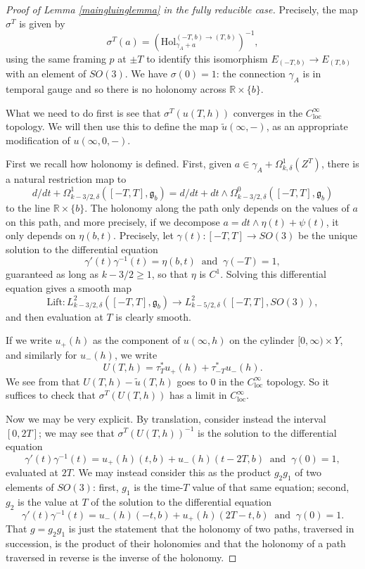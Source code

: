\documentclass[10pt,a4paper]{amsart}
\theoremstyle{definition}
\theoremstyle{remark}
\numberwithin{figure}{qchap}
\begin{document}
\begin{proof}[Proof of Lemma \ref{maingluinglemma} in the fully reducible case]
Precisely, the map $\sigma^T$ is given by $$\sigma^T(a) = \left(\text{Hol}_{\gamma_A + a}^{(-T,b) \to (T,b)}\right)^{-1},$$ using the same framing $p$ at $\pm T$ to identify this isomorphism $E_{(-T,b)} \to E_{(T, b)}$ with an element of $SO(3)$. We have $\sigma(0) = 1$: the connection $\gamma_A$ is in temporal gauge and so there is no holonomy across $\mathbb R \times \{b\}$.

What we need to do first is see that $\sigma^T(u(T, h))$ converges in the $C^\infty_{\text{loc}}$ topology. We will then use this to define the map $\widetilde u(\infty, -)$, as an appropriate modification of $u(\infty, 0, -)$.

First we recall how holonomy is defined. First, given $a \in \gamma_A + \Omega^1_{k,\delta}(Z^T)$, there is a natural restriction map to $$d/dt + \Omega^1_{k-3/2,\delta}([-T, T], \mathfrak g_b) = d/dt + dt \wedge \Omega^0_{k-3/2, \delta}([-T, T], \mathfrak g_b)$$ to the line $\mathbb R \times \{b\}$. The holonomy along the path only depends on the values of $a$ on this path, and more precisely, if we decompose $a = dt \wedge \eta(t) + \psi(t)$, it only depends on $\eta(b,t)$. Precisely, let $\gamma(t): [-T, T] \to SO(3)$ be the unique solution to the differential equation 
$$\gamma'(t) \gamma^{-1}(t) = \eta(b,t) \;\; \text{and} \;\; \gamma(-T) = 1,$$ 
guaranteed as long as $k-3/2 \geq 1$, so that $\eta$ is $C^1$. Solving this differential equation gives a smooth map 
$$\text{Lift}: L^2_{k-3/2,\delta}([-T, T], \mathfrak g_b) \to L^2_{k-5/2,\delta}([-T, T], SO(3)),$$ 
and then evaluation at $T$ is clearly smooth.

If we write $u_+(h)$ as the component of $u(\infty, h)$ on the cylinder $[0,\infty) \times Y$, and similarly for $u_-(h)$, we write 
$$U(T, h) = \tau_T^*u_+(h) + \tau_{-T}^* u_-(h).$$ 
We see from \cite[Lemma~3.5.19]{Lin} that $U(T, h) - \widetilde u(T, h)$ goes to $0$ in the $C^\infty_{\text{loc}}$ topology. So it suffices to check that $\sigma^T(U(T, h))$ has a limit in $C^\infty_{\text{loc}}.$

Now we may be very explicit. By translation, consider instead the interval $[0, 2T]$; we may see that $\sigma^T(U(T, h))^{-1}$ is the solution to the differential equation $$\gamma'(t) \gamma^{-1}(t) = u_+(h)(t,b) + u_-(h)(t-2T,b)\;\; \text{and} \;\; \gamma(0) = 1,$$ evaluated at $2T$. We may instead consider this as the product $g_2 g_1$ of two elements of $SO(3)$: first, $g_1$ is the time-$T$ value of that same equation; second, $g_2$ is the value at $T$ of the solution to the differential equation 
$$\gamma'(t) \gamma^{-1}(t) = u_-(h)(-t,b) + u_+(h)(2T-t,b) \;\; \text{and} \;\; \gamma(0) = 1.$$
That $g = g_2 g_1$ is just the statement that the holonomy of two paths, traversed in succession, is the product of their holonomies and that the holonomy of a path traversed in reverse is the inverse of the holonomy.


\end{proof}
\end{document}
